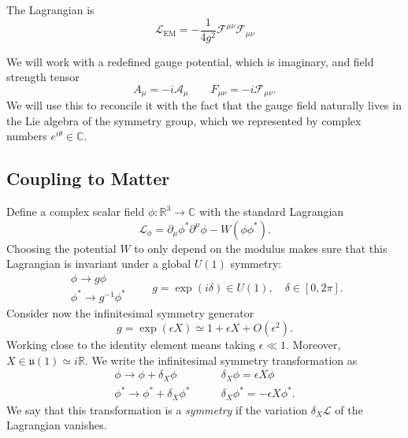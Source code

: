 The Lagrangian is
\begin{equation}
  \mathcal{L}_{\text{EM}} = -\frac{1}{4 g^2} \mathcal{F}^{\mu\nu} \mathcal{F}_{\mu\nu}
\end{equation}

We will work with a redefined gauge potential, which is imaginary, and field strength tensor
\begin{equation}
  A_{\mu} = -i \mathcal{A}_{\mu} \qquad F_{\mu\nu} = -i \mathcal{F}_{\mu\nu}.
\end{equation}
We will use this to reconcile it with the fact that the gauge field naturally lives in the Lie algebra of the symmetry group, which we represented by complex numbers $e^{i \theta} \in \mathbb{C}$.

\subsection{Coupling to Matter}%
\label{sub:coupling_to_matter}

Define a complex scalar field $\phi \colon \mathbb{R}^3 \to \mathbb{C}$ with the standard Lagrangian
\begin{equation}
  \mathcal{L}_\phi = \partial_{\mu} \phi^* \partial^{\mu} \phi - W(\phi \phi^*).
\end{equation}
Choosing the potential $W$ to only depend on the modulus makes sure that this Lagrangian is invariant under a global $U(1)$ symmetry:
\begin{equation}
  \begin{gathered}
    \phi \to g\phi \\
    \phi^* \to g^{-1} \phi^*
  \end{gathered}
  \qquad g = \exp(i \delta) \in U(1), \quad \delta \in [0, 2\pi].
\end{equation}
Consider now the infinitesimal symmetry generator
\begin{equation}
  g = \exp(\epsilon X) \simeq 1 + \epsilon X + O(\epsilon^2).
\end{equation}
Working close to the identity element means taking $\epsilon \ll 1$. Moreover, $X \in \mathfrak{u}(1) \simeq i \mathbb{R}$.
We write the infinitesimal symmetry transformation as 
\begin{equation}
  \begin{gathered}
    \phi \to \phi + \delta_X \phi \\
    \phi^* \to \phi^* + \delta_X \phi^*
  \end{gathered}
  \qquad
  \begin{gathered}
    \delta_X \phi = \epsilon X \phi \\
    \delta_X \phi^* = -\epsilon X \phi^*.
  \end{gathered}
\end{equation}
We say that this transformation is a \emph{symmetry} if the variation $\delta_X \mathcal{L}$ of the Lagrangian vanishes. 

